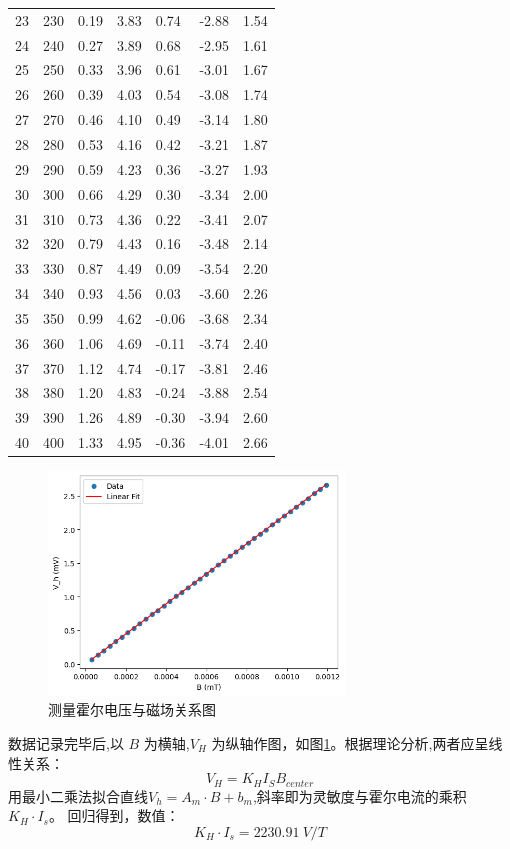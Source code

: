 \documentclass[UTF8]{ctexart}
\begin{document}
\begin{table}[htbp]
\begin{tabular}{l|llllll}
            23&230&0.19&3.83&0.74&-2.88&1.54\\
            24&240&0.27&3.89&0.68&-2.95&1.61\\
            25&250&0.33&3.96&0.61&-3.01&1.67\\
            26&260&0.39&4.03&0.54&-3.08&1.74\\
            27&270&0.46&4.10&0.49&-3.14&1.80\\
            28&280&0.53&4.16&0.42&-3.21&1.87\\
            29&290&0.59&4.23&0.36&-3.27&1.93\\
            30&300&0.66&4.29&0.30&-3.34&2.00\\
            31&310&0.73&4.36&0.22&-3.41&2.07\\
            32&320&0.79&4.43&0.16&-3.48&2.14\\
            33&330&0.87&4.49&0.09&-3.54&2.20\\
            34&340&0.93&4.56&0.03&-3.60&2.26\\
            35&350&0.99&4.62&-0.06&-3.68&2.34\\
            36&360&1.06&4.69&-0.11&-3.74&2.40\\
            37&370&1.12&4.74&-0.17&-3.81&2.46\\
            38&380&1.20&4.83&-0.24&-3.88&2.54\\
            39&390&1.26&4.89&-0.30&-3.94&2.60\\
            40&400&1.33&4.95&-0.36&-4.01&2.66\\
            \end{tabular}
    \end{table}
    \newpage
    \begin{figure}[htbp]
        \centering
        \includegraphics[width=0.7\textwidth]{hall_effect_Im.png}
        \caption{测量霍尔电压与磁场关系图}
        \label{fig:hall_effect_Im}
    \end{figure}
    数据记录完毕后,以 $B$ 为横轴,$V_H$ 为纵轴作图，如图\ref{fig:hall_effect_Im}。根据理论分析,两者应呈线性关系：
    \begin{equation}
    V_H = K_H I_S B_{center}
    \end{equation}
    用最小二乘法拟合直线$V_h = A_m \cdot B + b_m$,斜率即为灵敏度与霍尔电流的乘积 $K_H \cdot I_s$。
    回归得到，数值：
    \begin{equation}
        K_H \cdot I_s = \SI{2230.91}{V/T}
    \end{equation}
    
\end{document}
